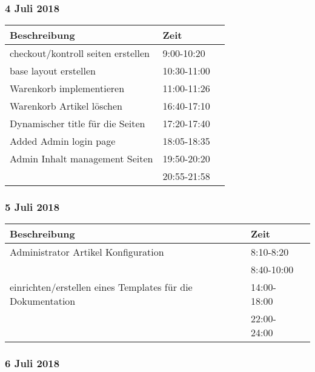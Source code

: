 \documentclass[a4paper, 11pt]{article}
\begin{document}
\subsubsection{4 Juli 2018}

\begin{tabular}{llr}
\toprule
Beschreibung & Zeit \\
\midrule
checkout/kontroll seiten erstellen & 9:00-10:20 \\
base layout erstellen & 10:30-11:00 \\
Warenkorb implementieren & 11:00-11:26 \\
Warenkorb Artikel löschen & 16:40-17:10 \\
Dynamischer title für die Seiten & 17:20-17:40 \\
Added Admin login page & 18:05-18:35 \\
Admin Inhalt management Seiten & 19:50-20:20 \\
 & 20:55-21:58 \\
\bottomrule
\end{tabular}

\subsubsection{5 Juli 2018}

\begin{tabular}{llr}
\toprule
Beschreibung & Zeit \\
\midrule
Administrator Artikel Konfiguration & 8:10-8:20 \\
 & 8:40-10:00 \\
einrichten/erstellen eines Templates für die Dokumentation & 14:00-18:00 \\
 & 22:00-24:00 \\
\bottomrule
\end{tabular}

\subsubsection{6 Juli 2018}
\end{document}
